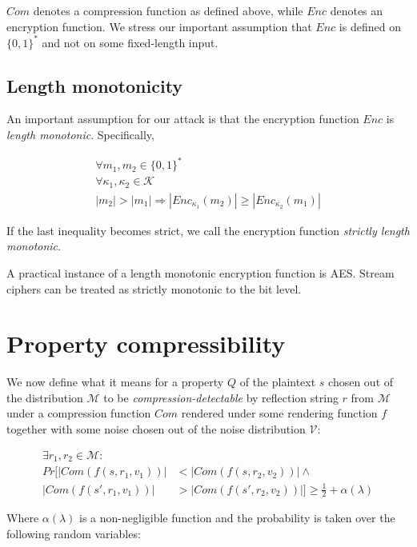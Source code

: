 \documentclass[a4paper, 11 pt, conference]{article}
\begin{document}
$Com$ denotes a compression function as defined above, while $Enc$ denotes an
encryption function. We stress our important assumption that $Enc$ is defined
on $\{0, 1\}^*$ and not on some fixed-length input.

\subsection{Length monotonicity}\label{subsec:lenmonotone}

An important assumption for our attack is that the encryption function $Enc$ is
\textit{length monotonic}. Specifically,

\begin{equation*}
\begin{split}
\forall m_1, m_2 \in \{0, 1\}^*\\
\forall \kappa_1, \kappa_2 \in \mathcal{K}\\
|m_2| > |m_1|
\Rightarrow
|Enc_{\kappa_1}(m_2)| \geq |Enc_{\kappa_2}(m_1)|
\end{split}
\end{equation*}

If the last inequality becomes strict, we call the encryption function
\textit{strictly length monotonic}.

A practical instance of a length monotonic encryption function is AES.
Stream ciphers can be treated as strictly monotonic to the bit level.

\section{Property compressibility}\label{sec:propertycom}

We now define what it means for a property $Q$ of the plaintext $s$ chosen out
of the distribution $\mathcal{M}$ to be \textit{compression-detectable} by
reflection string $r$ from $\mathcal{M}$ under a compression function $Com$
rendered under some rendering function $f$ together with some noise chosen out
of the noise distribution $\mathcal{V}$:

\begin{align*}
    \exists r_1, r_2 \in \mathcal{M}:\\
    Pr[|Com(f(s, r_1, v_1))| &< |Com(f(s, r_2, v_2))| \land\\
       |Com(f(s', r_1, v_1))| &> |Com(f(s', r_2, v_2))|]
    \geq
    \frac{1}{2} + \alpha(\lambda)
\end{align*}

Where $\alpha(\lambda)$ is a non-negligible function and
the probability is taken over the following random variables:
\end{document}
